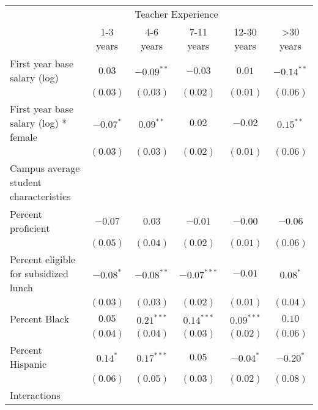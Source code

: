 \documentclass[12pt,]{article}
\begin{document}
\begin{table}
\begin{center}
\begin{tabular}{l c c c c c }
\hline
 & \multicolumn{4}{c}{Teacher Experience} \\ \cline{2-6}
 & 1-3 years & 4-6 years & 7-11 years & 12-30 years & >30 years \\
\hline
First year base salary (log)                & $0.03$        & $-0.09^{**}$  & $-0.03$       & $0.01$       & $-0.14^{**}$ \\
                                            & $(0.03)$      & $(0.03)$      & $(0.02)$      & $(0.01)$     & $(0.06)$     \\
First year base salary (log) * female       & $-0.07^{*}$   & $0.09^{**}$   & $0.02$        & $-0.02$      & $0.15^{**}$  \\
                                            & $(0.03)$      & $(0.03)$      & $(0.02)$      & $(0.01)$     & $(0.06)$     \\
Campus average student characteristics      &               &               &               &              &              \\
\quad Percent proficient                    & $-0.07$       & $0.03$        & $-0.01$       & $-0.00$      & $-0.06$      \\
                                            & $(0.05)$      & $(0.04)$      & $(0.02)$      & $(0.01)$     & $(0.06)$     \\
\quad Percent eligible for subsidized lunch & $-0.08^{*}$   & $-0.08^{**}$  & $-0.07^{***}$ & $-0.01$      & $0.08^{*}$   \\
                                            & $(0.03)$      & $(0.03)$      & $(0.02)$      & $(0.01)$     & $(0.04)$     \\
\quad Percent Black                         & $0.05$        & $0.21^{***}$  & $0.14^{***}$  & $0.09^{***}$ & $0.10$       \\
                                            & $(0.04)$      & $(0.04)$      & $(0.03)$      & $(0.02)$     & $(0.06)$     \\
\quad Percent Hispanic                      & $0.14^{*}$    & $0.17^{***}$  & $0.05$        & $-0.04^{*}$  & $-0.20^{*}$  \\
                                            & $(0.06)$      & $(0.05)$      & $(0.03)$      & $(0.02)$     & $(0.08)$     \\
Interactions                                &               &               &               &              &              \\

\end{tabular}
\end{center}
\end{table}
\end{document}
